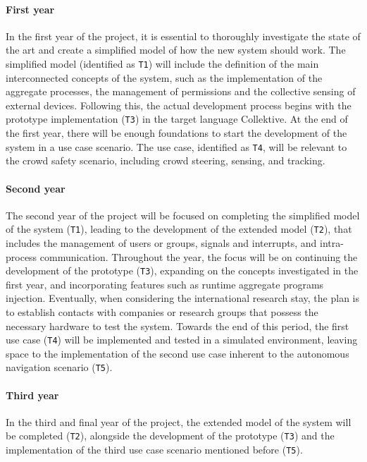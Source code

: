 \documentclass[12pt, a4paper]{article}
\begin{document}
\paragraph{First year}
In the first year of the project,
it is essential to thoroughly investigate the state of the art and create a simplified model of how the new system should work.
%
The simplified model (identified as \texttt{T1})
will include the definition of the main interconnected concepts of the system,
such as the implementation of the aggregate processes,
the management of permissions and the collective sensing of external devices.
%
Following this,
the actual development process begins with the prototype implementation (\texttt{T3}) in the target language Collektive.
%
At the end of the first year,
there will be enough foundations to start the development of the system in a use case scenario.
%
The use case, identified as \texttt{T4},
will be relevant to the crowd safety scenario,
including crowd steering, sensing, and tracking.

\sloppypar
\paragraph{Second year}
The second year of the project will be focused on completing the simplified model of the system (\texttt{T1}),
leading to the development of the extended model (\texttt{T2}),
that includes the management of users or groups, signals and interrupts, and intra-process communication.
%
Throughout the year,
the focus will be on continuing the development of the prototype (\texttt{T3}),
expanding on the concepts investigated in the first year,
and incorporating features such as runtime aggregate programs injection.
%
Eventually,
when considering the international research stay,
the plan is to establish contacts with companies or research groups that possess the necessary hardware to test the system.
%
Towards the end of this period,
the first use case (\texttt{T4}) will be implemented and tested in a simulated environment,
leaving space to the implementation of the second use case inherent to the autonomous navigation scenario (\texttt{T5}).

\sloppypar
\paragraph{Third year}
In the third and final year of the project,
the extended model of the system will be completed (\texttt{T2}), alongside the development of the prototype (\texttt{T3})
and the implementation of the third use case scenario mentioned before (\texttt{T5}).
\end{document}
